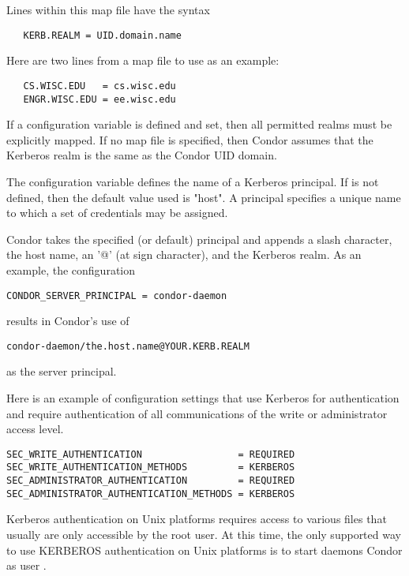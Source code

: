 Lines within this map file have the syntax
\begin{verbatim}
   KERB.REALM = UID.domain.name
\end{verbatim}

Here are two lines from a map file to use as an example:
\begin{verbatim}
   CS.WISC.EDU   = cs.wisc.edu
   ENGR.WISC.EDU = ee.wisc.edu
\end{verbatim}

If a 
configuration variable is defined and set,
then all permitted realms must be explicitly mapped.
If no map file is specified, then Condor assumes that the
Kerberos realm is the same as the Condor UID domain.

The configuration variable
defines the name of a Kerberos principal.
If  is not defined,
then the default value used is "host".
A principal specifies a unique name to which a set of credentials
may be assigned.

Condor takes the specified (or default) principal and appends
a slash character, the host name, an '@' (at sign character),
and the Kerberos realm.
As an example, the configuration
\begin{verbatim}
CONDOR_SERVER_PRINCIPAL = condor-daemon
\end{verbatim}
results in Condor's use of
\begin{verbatim}
condor-daemon/the.host.name@YOUR.KERB.REALM
\end{verbatim}
as the server principal.

Here is
an example of configuration settings that use Kerberos for
authentication and require authentication of all communications
of the write or administrator access level.
\footnotesize
\begin{verbatim}
SEC_WRITE_AUTHENTICATION                 = REQUIRED
SEC_WRITE_AUTHENTICATION_METHODS         = KERBEROS
SEC_ADMINISTRATOR_AUTHENTICATION         = REQUIRED
SEC_ADMINISTRATOR_AUTHENTICATION_METHODS = KERBEROS
\end{verbatim}
\normalsize

Kerberos authentication on Unix platforms
requires access to various files that
usually are only accessible by the root user.
At this time,
the only supported way to use KERBEROS authentication on Unix platforms
is to start daemons Condor as user .

